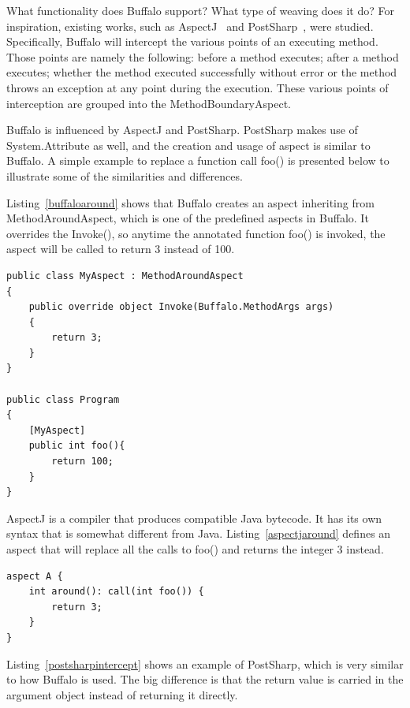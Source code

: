 What functionality does Buffalo support? What type of weaving does it do? For inspiration, existing works, such as AspectJ~\cite{aspectj_faq} and PostSharp~\cite{postsharp}, were studied. Specifically, Buffalo will intercept the various points of an executing method. Those points are namely the following: before a method executes; after a method executes; whether the method executed successfully without error or the method throws an exception at any point during the execution. These various points of interception are grouped into the MethodBoundaryAspect.

Buffalo is influenced by AspectJ and PostSharp. PostSharp makes use of System.Attribute as well, and the creation and usage of aspect is similar to Buffalo. A simple example to replace a function call foo() is presented below to illustrate some of the similarities and differences.

Listing~\ref{buffaloaround} shows that Buffalo creates an aspect inheriting from MethodAroundAspect, which is one of the predefined aspects in Buffalo. It overrides the Invoke(), so anytime the annotated function foo() is invoked, the aspect will be called to return 3 instead of 100.

\begin{minipage}{\textwidth}
\begin{lstlisting}[caption={Buffalo MethodAroundAspect}, label=buffaloaround]
public class MyAspect : MethodAroundAspect
{
    public override object Invoke(Buffalo.MethodArgs args)
    {
        return 3;
    }
}

public class Program
{
    [MyAspect]
    public int foo(){
        return 100;
    }
}
\end{lstlisting}
\end{minipage}

AspectJ is a compiler that produces compatible Java bytecode. It has its own syntax that is somewhat different from Java. Listing~\ref{aspectjaround} defines an aspect that will replace all the calls to foo() and returns the integer 3 instead.

\begin{minipage}{\textwidth}
\begin{lstlisting}[caption={AspectJ Around}, label=aspectjaround]
aspect A {
    int around(): call(int foo()) {
        return 3;
    }
}
\end{lstlisting}
\end{minipage}


Listing~\ref{postsharpintercept} shows an example of PostSharp, which is very similar to how Buffalo is used. The big difference is that the return value is carried in the argument object instead of returning it directly.

